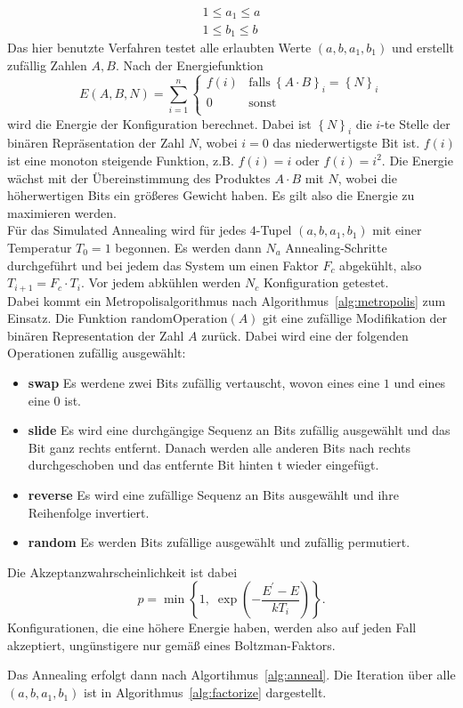 \begin{align*}
		1\leq a_1\leq a \\
		1\leq b_1\leq b
\end{align*}
Das hier benutzte Verfahren testet alle erlaubten Werte $\left(a,b,a_1,b_1\right)$ und erstellt zufällig Zahlen $A,B$. Nach der Energiefunktion
\begin{equation*}
		E\left(A,B,N\right)=\sum\limits_{i=1}^n\begin{cases}
		  		f\left(i\right) & \mathrm{falls}\:{\left\{A\cdot B\right\}}_i={\left\{N\right\}}_i \\
						0 & \mathrm{sonst}\\
				\end{cases}
\end{equation*}
wird die Energie der Konfiguration berechnet. Dabei ist ${\left\{N\right\}}_i$ die $i$-te Stelle der binären Repräsentation der Zahl $N$, wobei $i=0$ das niederwertigste Bit ist. $f\left(i\right)$ ist eine monoton steigende Funktion, z.B. $f\left(i\right)=i$ oder $f\left(i\right)=i^2$. Die Energie wächst mit der Übereinstimmung des Produktes $A\cdot B$ mit $N$, wobei die höherwertigen Bits ein größeres Gewicht haben. Es gilt also die Energie zu maximieren werden. \\
Für das Simulated Annealing wird für jedes $4$-Tupel $\left(a,b,a_1,b_1\right)$ mit einer Temperatur $T_0=1$ begonnen. Es werden dann $N_a$ Annealing-Schritte durchgeführt und bei jedem das System um einen Faktor $F_c$ abgekühlt, also $T_{i+1}=F_c\cdot T_i$. Vor jedem abkühlen werden $N_c$ Konfiguration getestet. \\
Dabei kommt ein Metropolisalgorithmus nach Algorithmus~\ref{alg:metropolis} zum Einsatz. Die Funktion $\mathrm{randomOperation}\left(A\right)$ git eine zufällige Modifikation der binären Representation der Zahl $A$ zurück. Dabei wird eine der folgenden Operationen zufällig ausgewählt:
\begin{itemize}
		\item \textbf{swap} Es werdene zwei Bits zufällig vertauscht, wovon eines eine $1$ und eines eine $0$ ist.
		\item \textbf{slide} Es wird eine durchgängige Sequenz an Bits zufällig ausgewählt und das Bit ganz rechts entfernt. Danach werden alle anderen Bits nach rechts durchgeschoben und das entfernte Bit hinten t wieder eingefügt.
		\item \textbf{reverse} Es wird eine zufällige Sequenz an Bits ausgewählt und ihre Reihenfolge invertiert.
		\item \textbf{random} Es werden Bits zufällige ausgewählt und zufällig permutiert.
\end{itemize}
Die Akzeptanzwahrscheinlichkeit ist dabei
\begin{equation*}
		p=\min\left\{1,\;\exp\left(-\frac{E^\prime-E}{k T_i}\right)\right\}.
\end{equation*}
Konfigurationen, die eine höhere Energie haben, werden also auf jeden Fall akzeptiert, ungünstigere nur gemäß eines Boltzman-Faktors.

Das Annealing erfolgt dann nach Algortihmus~\ref{alg:anneal}. Die Iteration über alle $\left(a,b,a_1,b_1\right)$ ist in Algorithmus~\ref{alg:factorize} dargestellt.


